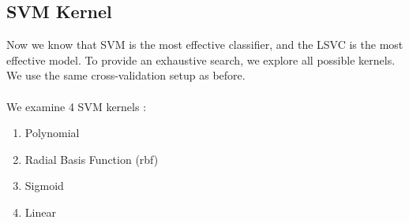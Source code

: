 \documentclass[runningheads]{llncs}
\begin{document}
\subsection{SVM Kernel}
\label{sec:results-classification-svm-kernel}

Now we know that SVM is the most effective classifier, and the LSVC is the most effective model.
To provide an exhaustive search, we explore all possible kernels.
We use the same cross-validation setup as before.
\\\\
We examine 4 SVM kernels \cite{sklearn2021feature}:

\begin{enumerate}
  \item Polynomial
  \item Radial Basis Function (rbf)
  \item Sigmoid
  \item Linear \cite{aizerman1964theoretical}
\end{enumerate}
\end{document}
